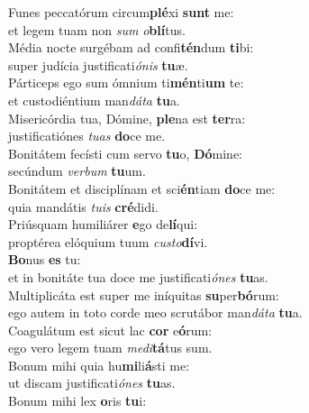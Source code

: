 \oddverse Funes peccatórum circum\textbf{plé}xi \textbf{sunt} me:~\*\\
\oddverse et legem tuam non \textit{sum} \textit{o}\textbf{blí}tus.\\
\evenverse Média nocte surgébam ad confi\textbf{tén}dum \textbf{ti}bi:~\*\\
\evenverse super judícia justificati\textit{ó}\textit{nis} \textbf{tu}æ.\\
\oddverse Párticeps ego sum ómnium ti\textbf{mén}ti\textbf{um} te:~\*\\
\oddverse et custodiéntium man\textit{dá}\textit{ta} \textbf{tu}a.\\
\evenverse Misericórdia tua, Dómine, \textbf{ple}na est \textbf{ter}ra:~\*\\
\evenverse justificatiónes \textit{tu}\textit{as} \textbf{do}ce me.\\
\oddverse Bonitátem fecísti cum servo \textbf{tu}o, \textbf{Dó}mine:~\*\\
\oddverse secúndum \textit{ver}\textit{bum} \textbf{tu}um.\\
\evenverse Bonitátem et disciplínam et sci\textbf{én}tiam \textbf{do}ce me:~\*\\
\evenverse quia mandátis \textit{tu}\textit{is} \textbf{cré}didi.\\
\oddverse Priúsquam humiliárer \textbf{e}go de\textbf{lí}qui:~\*\\
\oddverse proptérea elóquium tuum \textit{cu}\textit{sto}\textbf{dí}vi.\\
\evenverse \textbf{Bo}nus \textbf{es} tu:~\*\\
\evenverse et in bonitáte tua doce me justificati\textit{ó}\textit{nes} \textbf{tu}as.\\
\oddverse Multiplicáta est super me iníquitas \textbf{su}per\textbf{bó}rum:~\*\\
\oddverse ego autem in toto corde meo scrutábor man\textit{dá}\textit{ta} \textbf{tu}a.\\
\evenverse Coagulátum est sicut lac \textbf{cor} e\textbf{ó}rum:~\*\\
\evenverse ego vero legem tuam \textit{me}\textit{di}\textbf{tá}tus sum.\\
\oddverse Bonum mihi quia hu\textbf{mi}li\textbf{á}sti me:~\*\\
\oddverse ut discam justificati\textit{ó}\textit{nes} \textbf{tu}as.\\
\evenverse Bonum mihi lex \textbf{o}ris \textbf{tu}i:~\*\\
